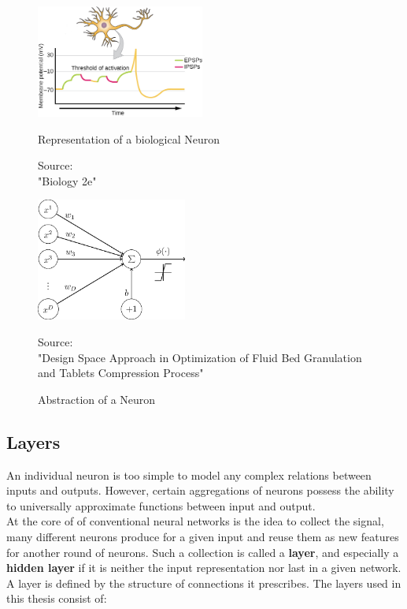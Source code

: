 \begin{figure}
	\centering
	\begin{minipage}{0.45\textwidth}
		\centering
		\includegraphics[height=140px]{gfx/2-Background/Biological_Neuron_edited.jpg}
		\caption{Representation of a biological Neuron}
		\label{fig:neuron1}
		\vspace{7pt}
		\footnotesize{ 
			Source:\\
			"Biology 2e" \cite{biology}}
	\end{minipage}
	\hfill
	\begin{minipage}{0.45\textwidth}
		\centering
		\includegraphics[height=152px]{gfx/2-Background/Abstract_Neuron.png}
		\caption{Abstraction of a Neuron}
		\label{fig:neuron2}
		\vspace{7pt}
		\footnotesize{ 
			Source:\\
			"Design Space Approach in Optimization of Fluid Bed Granulation and Tablets Compression Process" \cite{abstract_neuron}
		}
	\end{minipage}
\end{figure}

\subsection{Layers}
An individual neuron is too simple to model any complex relations between inputs and outputs. However, certain aggregations of neurons possess the ability to universally approximate functions between input and output.\cite{Approximator}\\
At the core of of conventional neural networks is the idea to collect the signal, many different neurons produce for a given input and reuse them as new features for another round
of neurons. Such a collection is called a \textbf{layer}, and especially a \textbf{hidden layer} if it is neither the input representation nor last in a given network.
A layer is defined by the structure of connections it prescribes. The layers used in this thesis consist of:

